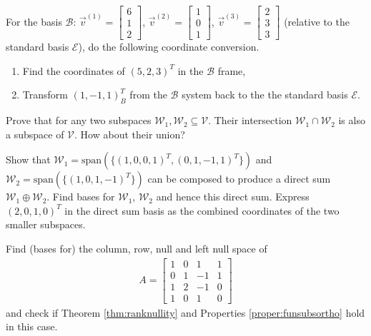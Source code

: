 \begin{Exercise}
For the basis $\mathcal{B}$: $\vec{v}^{(1)} = 
\begin{bmatrix}
6\\
1\\
2
\end{bmatrix}$,
$\vec{v}^{(2)} = 
\begin{bmatrix}
1\\
0\\
1
\end{bmatrix}$,
$\vec{v}^{(3)} = 
\begin{bmatrix}
2\\
3\\
3
\end{bmatrix}$
(relative to the standard basis $\mathcal{E}$), do the following coordinate conversion.
\begin{enumerate}[label=(\alph*)]
\item Find the coordinates of $(5, 2, 3)^T$ in the $\mathcal{B}$ frame,
\item Transform $(1, -1, 1)^T_B$ from the $\mathcal{B}$ system back to the the standard basis $\mathcal{E}$.
\end{enumerate}
\end{Exercise}

\begin{Exercise}
Prove that for any two subspaces $\mathcal{W}_1, \mathcal{W}_2 \subseteq \mathcal{V}$. Their intersection $\mathcal{W}_1 \cap \mathcal{W}_2$ is also a subspace of $\mathcal{V}$. How about their union?
\end{Exercise}

\begin{Exercise}
Show that $\mathcal{W}_1 = \text{span}(\{(1,0,0,1)^T, (0,1,-1,1)^T\})$ and $\mathcal{W}_2 = \text{span}(\{(1,0,1,-1)^T\})$ can be composed to produce a direct sum $\mathcal{W}_1 \oplus \mathcal{W}_2$. Find bases for $\mathcal{W}_1$, $\mathcal{W}_2$ and hence this direct sum. Express $(2,0,1,0)^T$ in the direct sum basis as the combined coordinates of the two smaller subspaces.
\end{Exercise}

\begin{Exercise}
Find (bases for) the column, row, null and left null space of 
\begin{align*}
A = 
\begin{bmatrix}
1 & 0 & 1 & 1 \\
0 & 1 & -1 & 1 \\
1 & 2 & -1 & 0 \\
1 & 0 & 1 & 0
\end{bmatrix}
\end{align*}
and check if Theorem \ref{thm:ranknullity} and Properties \ref{proper:funsubsortho} hold in this case.
\end{Exercise}